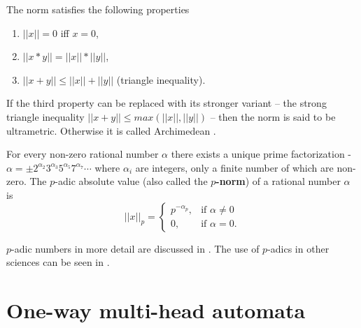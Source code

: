 \documentclass{llncs}
\begin{document}
The norm satisfies the following properties
\begin{enumerate}
\item $||x||=0$ iff $x=0$,
\item $||x*y|| = ||x||*||y||$,
\item $||x+y|| \leq ||x||+||y||$ (triangle inequality).
\end{enumerate}
If the third property can be replaced with its stronger variant -- the strong triangle inequality %
$||x+y|| \leq max(||x||,||y||)$ -- then the norm is said to be ultrametric. Otherwise it is called Archimedean \citep{Freivalds2012}.

\begin{definition}
For every non-zero rational number $\alpha$ there exists a unique prime factorization - $\alpha = \pm 2^{\alpha_2}3^{\alpha_3}5^{\alpha_5}7^{\alpha_7} \cdots$ where $\alpha_i$ are integers, only a finite number of which are non-zero.  The $p$-adic absolute value (also called the \textbf{$p$-norm}) of a rational number $\alpha$ is 
\[
||x||_p = \begin{cases}
p^{-\alpha_p}, &\textrm{if } \alpha \neq 0 \\
0, &\textrm{if } \alpha = 0.
\end{cases}
\]
\end{definition}

$p$-adic numbers in more detail are discussed in \citep{Madore}. The use of $p$-adics in other sciences can be seen in \citep{V.S.Vladimirov1995,Kozyrev2006,Dragovich2009}.

\section{One-way multi-head automata}
\end{document}
